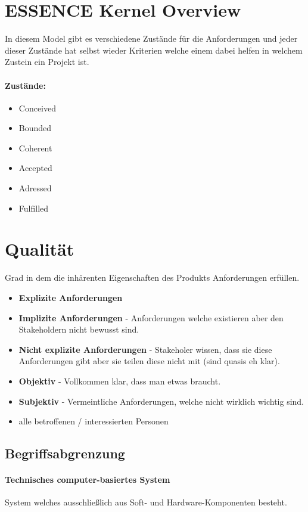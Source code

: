 \section{ESSENCE Kernel Overview}
In diesem Model gibt es verschiedene Zustände für die Anforderungen und jeder dieser Zustände hat selbst wieder Kriterien welche einem dabei helfen in welchem Zustein ein Projekt ist.
\paragraph{Zustände:}
\begin{itemize}
    \item Conceived
    \item Bounded
    \item Coherent
    \item Accepted
    \item Adressed
    \item Fulfilled
\end{itemize}

\section{Qualität}
Grad in dem die inhärenten Eigenschaften des Produkts Anforderungen erfüllen.

\begin{itemize}
	\item \textbf{Explizite Anforderungen}
	\item \textbf{Implizite Anforderungen} - Anforderungen welche existieren aber den Stakeholdern nicht bewusst sind.
	\item \textbf{Nicht explizite Anforderungen} - Stakeholer wissen, dass sie diese Anforderungen gibt aber sie teilen diese nicht mit (sind quasis eh klar).
	\item \textbf{Objektiv} - Vollkommen klar, dass man etwas braucht.
	\item \textbf{Subjektiv} - Vermeintliche Anforderungen, welche nicht wirklich wichtig sind.
	\item alle betroffenen / interessierten Personen
\end{itemize}

\subsection{Begriffsabgrenzung}
\paragraph{Technisches computer-basiertes System} System welches ausschließlich  aus Soft- und Hardware-Komponenten besteht.
